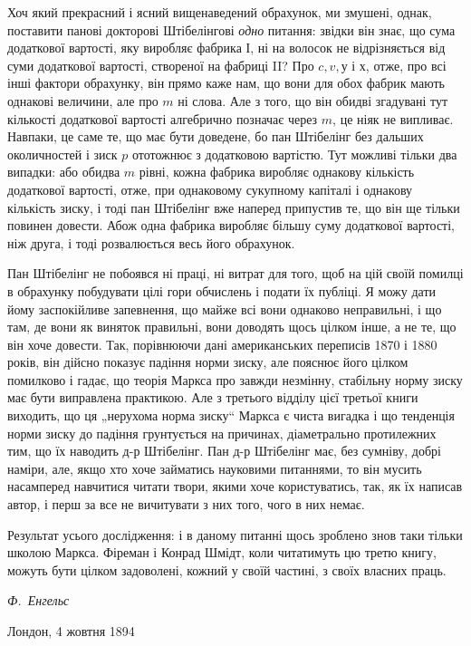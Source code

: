 
Хоч який прекрасний і ясний вищенаведений обрахунок, ми
змушені, однак, поставити панові докторові Штібелінгові \emph{одно}
питання: звідки він знає, що сума додаткової вартості, яку виробляє
фабрика І, ні на волосок не відрізняється від суми додаткової
вартості, створеної на фабриці II? Про $c, v, у$ і $х$, отже,
про всі інші фактори обрахунку, він прямо каже нам, що вони
для обох фабрик мають однакові величини, але про $m$ ні слова.
Але з того, що він обидві згадувані тут кількості додаткової
вартості алгебрично позначає через $m$, це ніяк не випливає.
Навпаки, це саме те, що має бути доведене, бо пан Штібелінг
без дальших околичностей і зиск $p$ ототожнює з додатковою
вартістю. Тут можливі тільки два випадки: або обидва $m$ рівні,
кожна фабрика виробляє однакову кількість додаткової вартості,
отже, при однаковому сукупному капіталі і однакову кількість
зиску, і тоді пан Штібелінг вже наперед припустив те, що він
ще тільки повинен довести. Абож одна фабрика виробляє більшу
суму додаткової вартості, ніж друга, і тоді розвалюється весь
його обрахунок.

Пан Штібелінг не побоявся ні праці, ні витрат для того, щоб
на цій своїй помилці в обрахунку побудувати цілі гори обчислень
і подати їх публіці. Я можу дати йому заспокійливе запевнення,
що майже всі вони однаково неправильні, і що там,
де вони як виняток правильні, вони доводять щось цілком інше,
а не те, що він хоче довести. Так, порівнюючи дані американських
переписів 1870 і 1880 років, він дійсно показує падіння
норми зиску, але пояснює його цілком помилково і гадає, що
теорія Маркса про завжди незмінну, стабільну норму зиску має
бути виправлена практикою. Але з третього відділу цієї третьої
книги виходить, що ця „нерухома норма зиску“ Маркса є чиста
вигадка і що тенденція норми зиску до падіння грунтується на
причинах, діаметрально протилежних тим, що їх наводить д-р
Штібелінг. Пан д-р Штібелінг має, без сумніву, добрі наміри,
але, якщо хто хоче займатись науковими питаннями, то він мусить
насамперед навчитися читати твори, якими хоче користуватись,
так, як їх написав автор, і перш за все не вичитувати
з них того, чого в них немає.

Результат усього дослідження: і в даному питанні щось
зроблено знов таки тільки школою Маркса. Фіреман і Конрад
Шмідт, коли читатимуть цю третю книгу, можуть бути цілком
задоволені, кожний у своїй частині, з своїх власних праць.
\begin{flushright}
  \emph{Ф.~Енгельс}
\end{flushright}
Лондон, 4 жовтня 1894~
